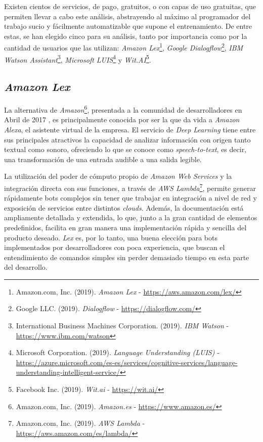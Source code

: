 \documentclass[11pt,spanish,listoffigures]{tfgetsinf}
\begin{document}
Existen cientos de servicios, de pago, gratuitos, o con capas de uso gratuitas, que permiten llevar a cabo este análisis, abstrayendo al máximo al programador del trabajo sucio y fácilmente automatizable que supone el entrenamiento. De entre estas, se han elegido cinco para su análisis, tanto por importancia como por la cantidad de usuarios que las utilizan: \textit{Amazon Lex}\footnote{Amazon.com, Inc. (2019). \textit{Amazon Lex} - \url{https://aws.amazon.com/lex/}}, \textit{Google Dialogflow}\footnote{Google LLC. (2019). \textit{Dialogflow} - \url{https://dialogflow.com/}}, \textit{IBM Watson Assistant}\footnote{International Business Machines Corporation. (2019). \textit{IBM Watson} - \url{https://www.ibm.com/watson}}, \textit{Microsoft LUIS}\footnote{Microsoft Corporation. (2019). \textit{Language Understanding (LUIS)} - \url{https://azure.microsoft.com/es-es/services/cognitive-services/language-understanding-intelligent-service/}} y \textit{Wit.AI}\footnote{Facebook Inc. (2019). \textit{Wit.ai} - \url{https://wit.ai/}}.

\subsection{\textit{Amazon Lex}}
\label{sec:amazon-lex}

La alternativa de \textit{Amazon}\footnote{Amazon.com, Inc. (2019). \textit{Amazon.es} - \url{https://www.amazon.es/}}, presentada a la comunidad de desarrolladores en Abril de 2017 \cite{amazon-lex}, es principalmente conocida por ser la que da vida a \textit{Amazon Alexa}, el asistente virtual de la empresa. El servicio de \textit{Deep Learning} tiene entre sus principales atractivos la capacidad de analizar información con origen tanto textual como sonoro, ofreciendo lo que se conoce como \textit{\gls{speech-to-text}}, es decir, una transformación de una entrada audible a una salida legible.

La utilización del poder de cómputo propio de \textit{Amazon Web Services} y la integración directa con sus funciones, a través de \textit{AWS Lambda}\footnote{Amazon.com, Inc. (2019). \textit{AWS Lambda} - \url{https://aws.amazon.com/es/lambda/}}, permite generar rápidamente bots complejos sin tener que trabajar en integración a nivel de red y exposición de servicios entre distintos \textit{clouds}. Además, la documentación está ampliamente detallada y extendida, lo que, junto a la gran cantidad de elementos predefinidos, facilita en gran manera una implementación rápida y sencilla del producto deseado. \textit{Lex} es, por lo tanto, una buena elección para bots implementados por desarrolladores con poca experiencia, que buscan el entendimiento de comandos simples sin perder demasiado tiempo en esta parte del desarrollo.
\end{document}
